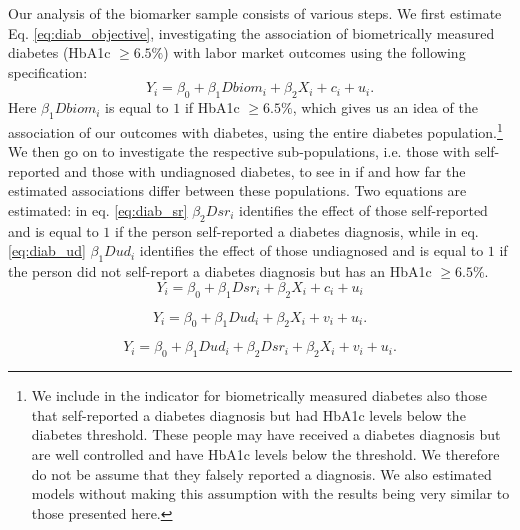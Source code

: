 \documentclass[12pt,english]{article}
\begin{document}
Our analysis of the biomarker sample consists of various steps. We first estimate Eq. \ref{eq:diab_objective}, investigating the association of biometrically measured diabetes (HbA1c $\geq6.5\%$) with labor market outcomes using the following specification:
\begin{equation}
Y_{i}=\beta_{0}+\beta_{1}Dbiom_{i}+\beta_{2}X_{i}+c_{i}+u_{i}\label{eq:diab_objective}.
\end{equation}
Here $\beta_{1}Dbiom_{i}$ is equal to $1$ if HbA1c $\geq6.5\%$, which gives us an idea of the association of our outcomes with diabetes, using the entire diabetes population.\footnote{We include in the indicator for biometrically measured diabetes also those that self-reported a diabetes diagnosis but had \ac{HbA1c} levels below the diabetes threshold. These people may have received a diabetes diagnosis but are well controlled and have \ac{HbA1c} levels below the threshold. We therefore do not be assume that they falsely reported a diagnosis. We also estimated models without making this assumption with the results being very similar to those presented here.}
We then go on to investigate the respective sub-populations, i.e. those with self-reported and those with undiagnosed diabetes, to see in if and how far the estimated associations differ between these populations. Two equations are estimated: in eq. \ref{eq:diab_sr} $\beta_{2}Dsr_{i}$ identifies the effect of those self-reported and is equal to $1$ if the person self-reported a diabetes diagnosis, while in eq. \ref{eq:diab_ud}  $\beta_{1}Dud_{i}$ identifies the effect of those undiagnosed and is equal to $1$ if the person did not self-report a diabetes diagnosis but has an HbA1c $\geq6.5\%$.
\begin{equation}
Y_{i}=\beta_{0}+\beta_{1}Dsr_{i}+\beta_{2}X_{i}+c_{i}+u_{i}\label{eq:diab_sr}
\end{equation}

\begin{equation}
Y_{i}=\beta_{0}+\beta_{1}Dud_{i}+\beta_{2}X_{i}+v_{i}+u_{i}.\label{eq:dia_ud}
\end{equation}

\begin{equation}
Y_{i}=\beta_{0}+\beta_{1}Dud_{i}+\beta_{2}Dsr_{i}+\beta_{2}X_{i}+v_{i}+u_{i}.\label{eq:diab_sr_ud}
\end{equation}
\end{document}

